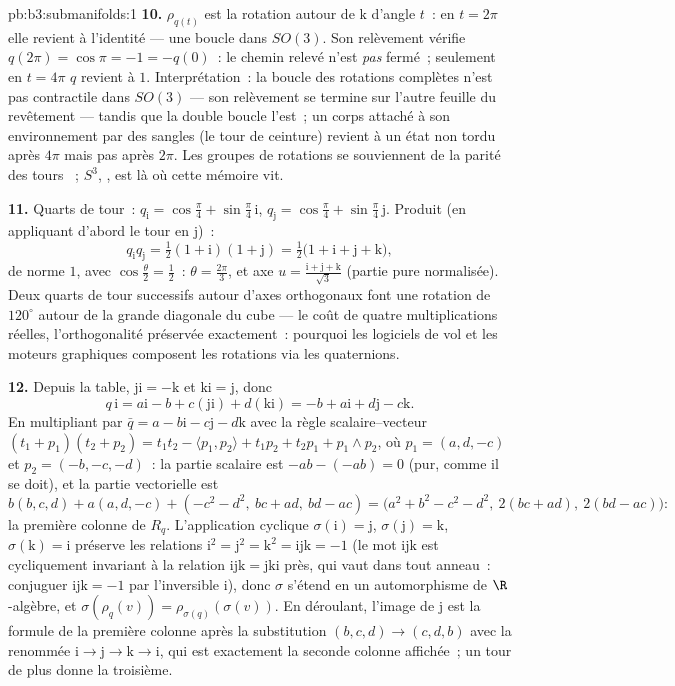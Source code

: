 \begin{solution}{pb:b3:submanifolds:1}
\textbf{10.} $\rho_{q(t)}$ est la rotation autour de
$\mathrm k$ d'angle $t$~: en $t = 2\pi$ elle revient à
l'identité --- une boucle dans $SO(3)$. Son relèvement
vérifie $q(2\pi) = \cos\pi = -1 = -q(0)$~: le chemin relevé
n'est \emph{pas} fermé~; seulement en $t = 4\pi$ $q$
revient à $1$. Interprétation~: la boucle des rotations
complètes n'est pas contractile dans $SO(3)$ --- son
relèvement se termine sur l'autre feuille du revêtement ---
tandis que la double boucle l'est~; un corps attaché à son
environnement par des sangles (le tour de ceinture)
revient à un état non tordu après $4\pi$ mais pas après
$2\pi$. Les groupes de rotations se souviennent de la
parité des tours ~; $S^3$, , est
là où cette mémoire vit.

\textbf{11.} Quarts de tour~: $q_{\mathrm i} =
\cos\frac\pi4 + \sin\frac\pi4\,\mathrm i$, $q_{\mathrm j} =
\cos\frac\pi4 + \sin\frac\pi4\,\mathrm j$. Produit (en
appliquant d'abord le tour en $\mathrm j$)~:
\[
q_{\mathrm i}q_{\mathrm j} = \tfrac12(1 + \mathrm i)(1 +
\mathrm j) = \tfrac12\bigl(1 + \mathrm i + \mathrm j +
\mathrm k\bigr),
\]
de norme $1$, avec $\cos\frac\theta2 = \frac12$~: $\theta =
\frac{2\pi}3$, et axe $u = \frac{\mathrm i + \mathrm j +
\mathrm k}{\sqrt3}$ (partie pure normalisée). Deux quarts
de tour successifs autour d'axes orthogonaux font une
rotation de $120^\circ$ autour de la grande diagonale du
cube --- le coût de quatre multiplications réelles, l'orthogonalité
préservée exactement~: pourquoi les logiciels de vol et les
moteurs graphiques composent les rotations via les
quaternions.

\textbf{12.} Depuis la table, $\mathrm{ji} = -\mathrm k$ et
$\mathrm{ki} = \mathrm j$, donc
\[
q\,\mathrm i = a\mathrm i - b + c(\mathrm{ji}) +
d(\mathrm{ki}) = -b + a\mathrm i + d\mathrm j - c\mathrm k .
\]
En multipliant par $\bar q = a - b\mathrm i - c\mathrm j -
d\mathrm k$ avec la règle scalaire--vecteur $(t_1 +
p_1)(t_2 + p_2) = t_1t_2 - \langle p_1, p_2\rangle +
t_1p_2 + t_2p_1 + p_1\wedge p_2$, où $p_1 = (a, d, -c)$ et
$p_2 = (-b, -c, -d)$~: la partie scalaire est $-ab - (-ab)
= 0$ (pur, comme il se doit), et la partie vectorielle est
\[
b(b, c, d) + a(a, d, -c) + (-c^2 - d^2,\ bc + ad,\ bd - ac)
= \bigl(a^2 + b^2 - c^2 - d^2,\ 2(bc + ad),\ 2(bd -
ac)\bigr) :
\]
la première colonne de $R_q$. L'application cyclique
$\sigma(\mathrm i) = \mathrm j$, $\sigma(\mathrm j) =
\mathrm k$, $\sigma(\mathrm k) = \mathrm i$ préserve les
relations $\mathrm i^2 = \mathrm j^2 = \mathrm k^2 =
\mathrm{ijk} = -1$ (le mot $\mathrm{ijk}$ est
cycliquement invariant à la relation $\mathrm{ijk} =
\mathrm{jki}$ près, qui vaut dans tout anneau~: conjuguer
$\mathrm{ijk} = -1$ par l'inversible $\mathrm i$), donc
$\sigma$ s'étend en un automorphisme de $\R$-algèbre, et
$\sigma(\rho_q(v)) = \rho_{\sigma(q)}(\sigma(v))$. En
déroulant, l'image de $\mathrm j$ est la formule de la
première colonne après la substitution $(b, c, d) \to (c,
d, b)$ avec la  renommée $\mathrm i \to \mathrm j \to
\mathrm k \to \mathrm i$, qui est exactement la seconde
colonne affichée~; un tour de plus donne la troisième.


\end{solution}
